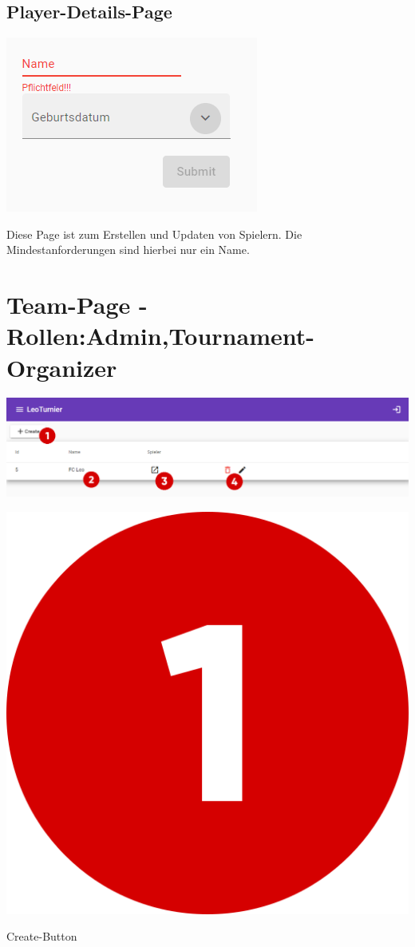\subsection{Player-Details-Page}
\includegraphics[scale=0.8]{pics/user-guide/player-create-page.PNG}

Diese Page ist zum Erstellen und Updaten von Spielern. Die Mindestanforderungen sind hierbei nur ein Name.


\section{Team-Page - Rollen:Admin,Tournament-Organizer}
\includegraphics[scale=0.44]{pics/user-guide/team-overview-page.PNG}
\bigskip

\includegraphics[scale=0.05]{pics/user-guide/numbers/number-1.png} \begin{LARGE} Create-Button \end{LARGE}

